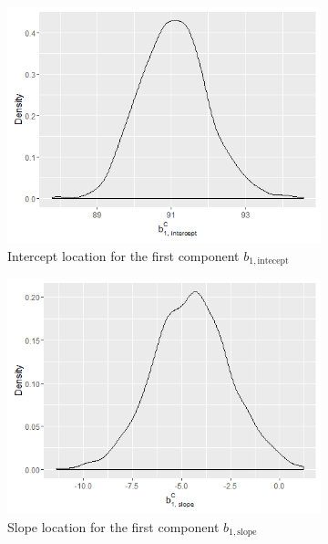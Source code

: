 \begin{figure}[!htb]
\centering
\begin{subfigure}[b]{0.4\textwidth}
		\includegraphics[width=\textwidth]{mainmatter/chapter_6_blood_donor/b11.png}
        \caption{\label{fig : mu_blood_donor_11} Intercept location for the first component $b_{1, \text{intecept}}$}
	\end{subfigure}
	\begin{subfigure}[b]{0.4\textwidth}
		\includegraphics[width=\textwidth]{mainmatter/chapter_6_blood_donor/b12.png}	
          \caption{\label{fig : mu_blood_donor_12}Slope location for the first component $b_{1, \text{slope}}$}
	\end{subfigure}
	\begin{subfigure}[b]{0.4\textwidth}

\end{subfigure}
\end{figure}
